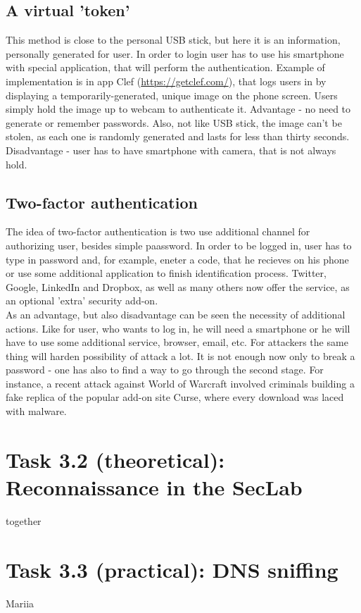 \documentclass{article}
\begin{document}
\subsection*{ A virtual 'token' }
\cite{altern} This method is close to the personal USB stick, but here it is an information, personally generated for user. In order to login user has to use his smartphone with special application, that will perform the authentication. Example of implementation is in app Clef (\url{https://getclef.com/}), that logs users in by displaying a temporarily-generated, unique image on the phone screen. Users simply hold the image up to webcam to authenticate it. Advantage - no need to generate or remember passwords. Also, not like USB stick, the image can't be stolen, as each one is randomly generated and lasts for less than thirty seconds. Disadvantage - user has to have smartphone with camera, that is not always hold.

\subsection*{ Two-factor authentication }
The idea of two-factor authentication is two use additional channel for authorizing user, besides simple paassword. In order to be logged in, user has to type in password and, for example, eneter a code, that he recieves on his phone or use some additional application to finish identification process. Twitter, Google, LinkedIn and Dropbox, as well as many others now offer the service, as an optional 'extra' security add-on. 
\\
As an advantage, but also disadvantage can be seen the necessity of additional actions. Like for user, who wants to log in, he will need a smartphone or he will have to use some additional service, browser, email, etc. For attackers the same thing will harden possibility of attack a lot. It is not enough now only to break a password - one has also to find a way to go through the second stage. For instance, a recent attack against World of Warcraft involved criminals building a fake replica of the popular add-on site Curse, where every download was laced with malware. \cite{twofact}

\section*{Task 3.2 (theoretical): Reconnaissance in the SecLab}
together

\section*{Task 3.3 (practical): DNS sniffing}
Mariia
\end{document}
